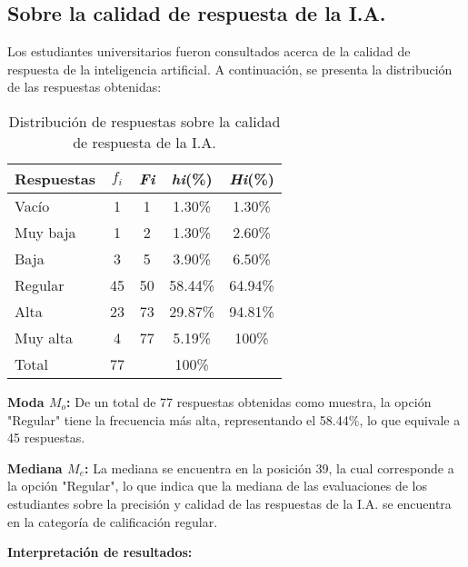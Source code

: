 \subsection{Sobre la calidad de respuesta de la I.A.}

Los estudiantes universitarios fueron consultados acerca de la calidad de respuesta de la inteligencia artificial. A continuación, se presenta la distribución de las respuestas obtenidas:


\begin{table}[H]
  \centering
  \renewcommand{\arraystretch}{1.2}
  \begin{tabular}{l c c c c}
    \hline
    {Respuestas} & {\(f_i\)} & \textit{Fi} & \textit{hi}(\%) & \textit{Hi}(\%)\\
    \hline
    Vacío    & 1  & 1  & 1.30\%  & 1.30\%\\
    Muy baja & 1  & 2  & 1.30\%  & 2.60\%\\
    Baja     & 3  & 5  & 3.90\%  & 6.50\%\\
    Regular  & 45 & 50 & 58.44\% & 64.94\%\\
    Alta     & 23 & 73 & 29.87\% & 94.81\%\\
    Muy alta & 4  & 77 & 5.19\%  & 100\%\\
    \hline
    Total    & 77 &    & 100\%   & \\
    \hline
  \end{tabular}
  \caption{Distribución de respuestas sobre la calidad de respuesta de la I.A.}
  \label{tabla:calidadRespuesta}
\end{table}

\textbf{Moda $M_o$:} De un total de 77 respuestas obtenidas como muestra, la opción "Regular" tiene la 
frecuencia más alta, representando el 58.44\%, lo que equivale a 45 respuestas.

\textbf{Mediana $M_e$:} La mediana se encuentra en la posición 39, la cual corresponde a la opción "Regular", lo que indica que la mediana de las evaluaciones de los estudiantes sobre la precisión y calidad de las respuestas de la I.A. se encuentra en la categoría de calificación regular.

\textbf{Interpretación de resultados:}

